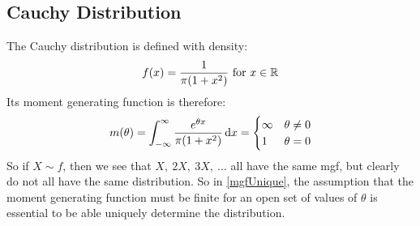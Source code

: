 \documentclass[../main.tex]{subfiles}
\begin{document}
\subsection{Cauchy Distribution}
The Cauchy distribution is defined with density:
\[
  f(x) = \frac{1}{\pi(1 + x^2)} \text{ for $x \in \mathbb{R}$}
\]
Its moment generating function is therefore:
\[
  m(\theta) = \int_{-\infty}^{\infty} \frac{e^{\theta x}}{\pi(1 + x^2)} \d{x} = \begin{cases}
  \infty & \theta \neq 0 \\
  1 & \theta = 0
  \end{cases}
\]
So if $X \sim f$, then we see that $X,\ 2X,\ 3X,\ \ldots$ all have the same mgf, but clearly do not all have the same distribution.
So in \cref{mgfUnique}, the assumption that the moment generating function must be finite for an open set of values of $\theta$ is essential to be able uniquely determine the distribution.
\end{document}
